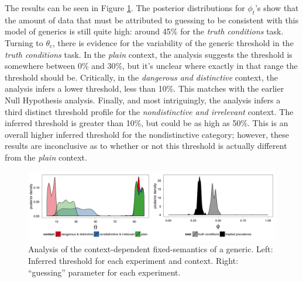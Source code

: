 \documentclass[10pt,letterpaper]{article}
\begin{document}

The results can be seen in Figure \ref{fig:justFixed}. 
The posterior distributions for $\phi_{t}$'s show that the amount of data that must be attributed to guessing to be consistent with this model of generics is still quite high: around 45\% for the \emph{truth conditions} task. 
Turning to $\theta_{c}$, there is evidence for the variability of the generic threshold in the \emph{truth conditions} task. In the \emph{plain} context, the analysis suggests the threshold is somewhere between 0\% and 30\%, but it's unclear where exactly in that range the threshold should be. Critically, in the \emph{dangerous and distinctive} context, the analysis infers a lower threshold, less than 10\%. This matches with the earlier Null Hypothesis analysis. Finally, and most intriguingly, the analysis infers a third distinct threshold profile for the \emph{nondistinctive and irrelevant} context.  The inferred threshold is greater than 10\%, but could be as high as 50\%. This is an overall higher inferred threshold for the nondistinctive category; however, these results are inconclusive as to whether or not this threshold is actually different from the \emph{plain} context.



\begin{figure}
\centering
    \includegraphics[width=\columnwidth]{fixed_phis_thetas}
    \caption{Analysis of the context-dependent fixed-semantics of a generic. Left: Inferred threshold for each experiment and context. Right: ``guessing'' parameter for each experiment.}
  \label{fig:justFixed}
\end{figure}




\end{document}
